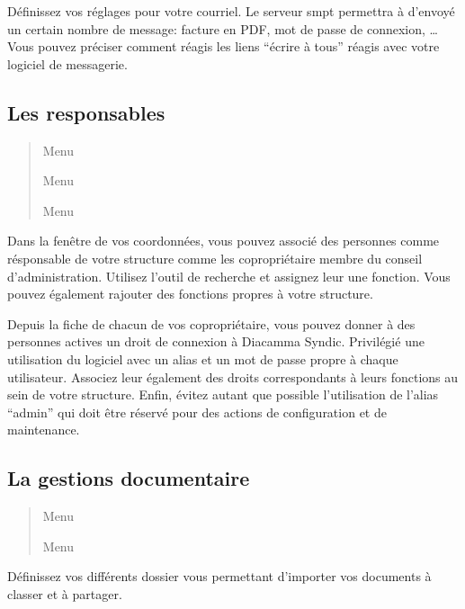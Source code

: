 \documentclass[a4paper,10pt,oneside,french]{sphinxmanual}
\begin{document}
Définissez vos réglages pour votre courriel.
Le serveur smpt permettra à  d’envoyé un certain nombre de message: facture en PDF, mot de passe de connexion, …
Vous pouvez préciser comment réagis les liens “écrire à tous” réagis avec votre logiciel de messagerie.


\subsection{Les responsables}
\label{\detokenize{syndic/first_step:les-responsables}}\begin{quote}

Menu 

Menu 

Menu 
\end{quote}

Dans la fenêtre de vos coordonnées, vous pouvez associé des personnes comme résponsable de votre structure comme les copropriétaire membre du conseil d’administration.
Utilisez l’outil de recherche et assignez leur une fonction.
Vous pouvez également rajouter des fonctions propres à votre structure.

Depuis la fiche de chacun de vos copropriétaire, vous pouvez donner à des personnes actives un droit de connexion à Diacamma Syndic.
Privilégié une utilisation du logiciel avec un alias et un mot de passe propre à chaque utilisateur. Associez leur également des droits correspondants à leurs fonctions au sein de votre structure.
Enfin, évitez autant que possible l’utilisation de l’alias “admin” qui doit être réservé pour des actions de configuration et de maintenance.


\subsection{La gestions documentaire}
\label{\detokenize{syndic/first_step:la-gestions-documentaire}}\begin{quote}

Menu 

Menu 
\end{quote}

Définissez vos différents dossier vous permettant d’importer vos documents à classer et à partager.
\end{document}
